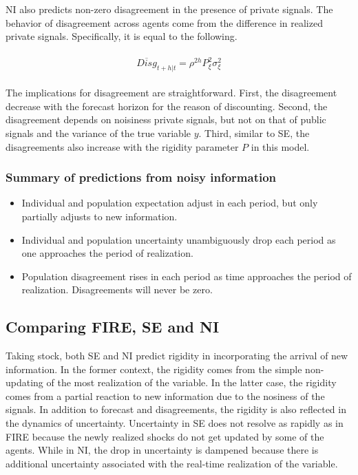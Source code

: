 \documentclass[12pt]{article}
\begin{document}
	NI also predicts non-zero disagreement in the presence of private signals. The behavior of disagreement across agents come from the difference in realized private signals. Specifically, it is equal to the following. 
	
	\begin{eqnarray}
		\begin{aligned}
			\overline {Disg}_{t+h|t} = \rho^{2h} P^2_\xi \sigma^2_\xi  
		\end{aligned}
	\end{eqnarray}
	
	The implications for disagreement are straightforward. First, the disagreement decrease with the forecast horizon for the reason of discounting. Second, the disagreement depends on noisiness private signals, but not on that of public signals and the variance of the true variable $y$. Third, similar to SE, the disagreements also increase with the rigidity parameter $P$ in this model.
	
	\subsubsection{Summary of predictions from noisy information}
	
	\begin{itemize}
		\item Individual and population expectation adjust in each period, but only partially adjusts to new information. 
		\item  Individual and population uncertainty unambiguously drop each period as one approaches the period of realization.  
		\item  Population disagreement rises in each period as time approaches the period of realization. Disagreements will never be zero. 
	\end{itemize}
	
	
	\subsection{Comparing FIRE, SE and NI}
	
	Taking stock, both SE and NI predict rigidity in incorporating the arrival of new information. In the former context, the rigidity comes from the simple non-updating of the most realization of the variable. In the latter case, the rigidity comes from a partial reaction to new information due to the nosiness of the signals.  In addition to forecast and disagreements, the rigidity is also reflected in the dynamics of uncertainty.  Uncertainty in SE does not resolve as rapidly as in FIRE because the newly realized shocks do not get updated by some of the agents. While in NI, the drop in uncertainty is dampened because there is additional uncertainty associated with the real-time realization of the variable.  
	
\end{document}
